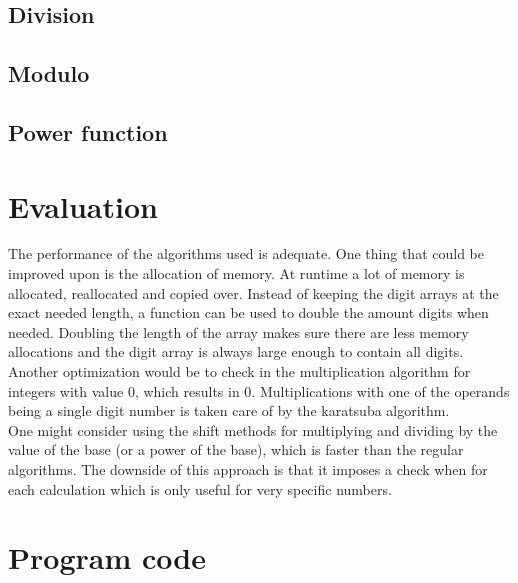 \documentclass[a4paper,11pt]{article}
\begin{document}
\subsection{Division}

\subsection{Modulo}

\subsection{Power function}

\section{Evaluation}
The performance of the algorithms used is adequate.
One thing that could be improved upon is the allocation of memory.
At runtime a lot of memory is allocated, reallocated and copied over.
Instead of keeping the digit arrays at the exact needed length, a function can be used to double the amount digits when needed.
Doubling the length of the array makes sure there are less memory allocations and the digit array is always large enough to contain all digits.\\
Another optimization would be to check in the multiplication algorithm for integers with value 0, which results in 0.
Multiplications with one of the operands being a single digit number is taken care of by the karatsuba algorithm.\\
One might consider using the shift methods for multiplying and dividing by the value of the base (or a power of the base), which is faster than the regular algorithms.
The downside of this approach is that it imposes a check when for each calculation which is only useful for very specific numbers.

\section{Program code}
\end{document}
